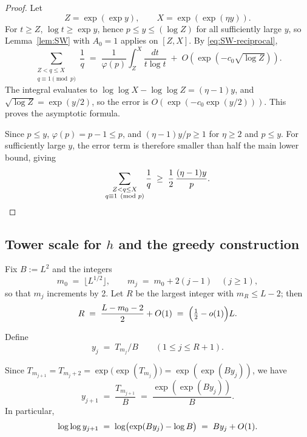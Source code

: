 \documentclass[11pt,reqno]{amsart}
\theoremstyle{plain}
\theoremstyle{definition}
\begin{document}
\begin{proof}
Let
\[
Z=\exp(\exp y),\qquad X=\exp(\exp(\eta y)).
\]
For $t\ge Z$, $\log t\ge \exp y$, hence $p\le y\le(\log Z)$ for all
sufficiently large $y$, so Lemma~\ref{lem:SW} with $A_0=1$ applies on $[Z,X]$.
By \eqref{eq:SW-reciprocal},
\[
\sum_{\substack{Z<q\le X\\ q\equiv 1\pmod p}}\frac1q
\;=\;
\frac1{\varphi(p)}\int_Z^X\frac{dt}{t\log t}
\;+\;
O\!\left(\exp(-c_0\sqrt{\log Z})\right).
\]
The integral evaluates to
$\log\log X-\log\log Z=(\eta-1)y$, and $\sqrt{\log Z}=\exp(y/2)$, so the
error is $O(\exp(-c_0\exp(y/2)))$. This proves the asymptotic formula.

Since $p\le y$, $\varphi(p)=p-1\le p$, and $(\eta-1)y/p\ge 1$ for $\eta\ge 2$
and $p\le y$. For sufficiently large $y$, the error term is therefore smaller
than half the main lower bound, giving
\[
\sum_{\substack{Z<q\le X\\ q\equiv 1\pmod p}}\frac1q
\;\ge\;
\frac12\,\frac{(\eta-1)y}{p}. \qedhere
\]
\end{proof}

\subsection{Tower scale for $h$ and the greedy construction}

Fix $B:=L^2$ and the integers
\begin{equation}\label{eq:m0-mj-h}
m_0 \;=\; \lfloor L^{1/2}\rfloor,
\qquad
m_j \;=\; m_0+2(j-1) \quad (j\ge 1),
\end{equation}
so that $m_j$ increments by 2. Let $R$ be the largest integer with $m_R\le L-2$;
then
\begin{equation}\label{eq:R-h}
R \;=\; \frac{L-m_0-2}{2} + O(1) \;=\; \Bigl(\tfrac12 - o(1)\Bigr)L.
\end{equation}

Define
\begin{equation}\label{eq:y_j-h}
y_j \;=\; T_{m_j}/B \qquad (1\le j\le R+1).
\end{equation}

Since $T_{m_{j+1}}=T_{m_j+2}=\exp\bigl(\exp(T_{m_j})\bigr)=\exp(\exp(B y_j))$, we have
\begin{equation}\label{eq:y_j+1-vs-y_j}
y_{j+1} \;=\; \frac{T_{m_{j+1}}}{B}\;=\;\frac{\exp(\exp(B y_j))}{B}.
\end{equation}
In particular,
\begin{equation}\label{eq:loglog-y_{j+1}}
\log\log y_{j+1} \;=\; \log\bigl(\exp(B y_j)-\log B\bigr)\;=\; By_j + O(1).
\end{equation}
\end{document}
